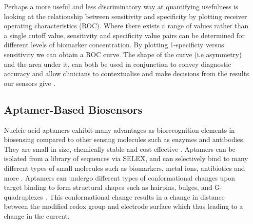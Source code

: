 Perhaps a more useful and less discriminatory way at quantifying usefulness is looking at the relationship between sensitivity and specificity by plotting receiver operating characteristics (ROC). Where there exists a range of values rather than a single cutoff value, sensitivity and specificity value pairs can be determined for different levels of biomarker concentration. By plotting 1-specificty versus sensitivity we can obtain a ROC curve. The shape of the curve (i.e asymmetry) and the area under it, can both be used in conjunction to convey diagnostic accuracy and allow clinicians to contextualise and make decisions from the results our sensors give \cite{kampfrath2013brief}. 
\subsection{Aptamer-Based Biosensors}
Nucleic acid aptamers exhibit many advantages as biorecognition elements in biosensing compared to other sensing molecules such as enzymes and antibodies. They are small in size, chemically stable and cost effective \cite{song2008aptamer}. Aptamers can be isolated from a library of sequences via SELEX, and can selectively bind to many different types of small molecules such as biomarkers, metal ions, antibiotics and more \cite{cai2018investigations}. Aptamers can undergo different types of conformational changes upon target binding to form structural shapes such as hairpins, bulges, and G-quadruplexes \cite{riccitelli2010computational}. This conformational change results in a change in distance between the modified redox group and electrode surface which thus leading to a change in the current.\\\\
